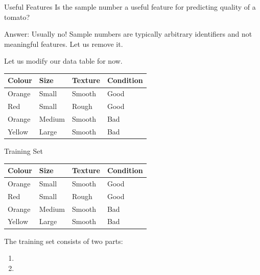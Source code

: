 \documentclass[usenames,dvipsnames]{beamer}
\begin{document}
\begin{frame}{Useful Features}
Is the sample number a useful feature for predicting quality of a tomato?

\pause Answer: Usually no! Sample numbers are typically arbitrary identifiers and not meaningful features. Let us remove it.

\pause Let us modify our data table for now.

\begin{table}[]
	\begin{tabular}{|l|l|l||l|}
		\hline 
		\textbf{Colour} & \textbf{Size} & \textbf{Texture} & \textbf{Condition} \\ \hline 
		Orange & Small & Smooth  & Good      \\
		Red    & Small  & Rough  & Good \\
		Orange & Medium & Smooth & Bad \\
		Yellow & Large  & Smooth & Bad \\ \hline 

	\end{tabular}
\end{table}
\end{frame}

\begin{frame}{Training Set}

\begin{table}[]
	\begin{tabular}{|l|l|l||l|}
		\hline 
				\rowcolor{white}
		\textbf{Colour} & \textbf{Size} & \textbf{Texture} & \textbf{Condition} \\ \hline 
		Orange & Small & Smooth  & Good      \\
		Red    & Small  & Rough  & Good \\
		Orange & Medium & Smooth & Bad \\
		Yellow & Large  & Smooth & Bad \\ \hline 
		
	\end{tabular}
\end{table}

\pause The training set consists of two parts:
\begin{enumerate}
	\item \pause \color{Lavender}{Features (Input Variables)}
	\item \pause \color{Tan}{Output or Response Variable}
\end{enumerate}
\end{frame}
\end{document}
